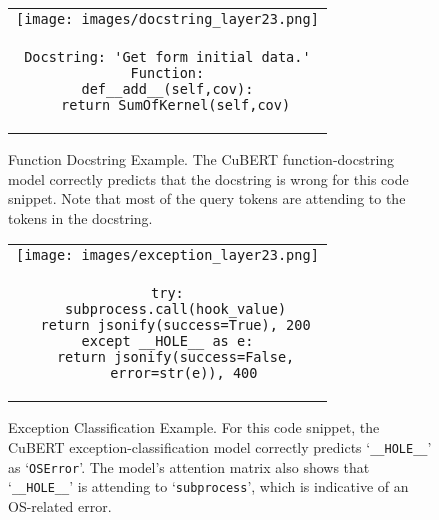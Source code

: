 \documentclass{article}
\begin{document}
\begin{figure*}
    \centering
    \begin{tabular}{c}
    \texttt{[image: images/docstring\_layer23.png]}\\
    \begin{lstlisting}[linewidth=0.6\textwidth]
Docstring: 'Get form initial data.'
Function:
def__add__(self,cov):
  return SumOfKernel(self,cov)
      \end{lstlisting} 
    \end{tabular}
    \caption{Function Docstring Example. The CuBERT function-docstring model correctly predicts that the docstring is wrong for this code snippet. Note that most of the query tokens are attending to the tokens in the docstring.}
    \label{fig:docstring_visualization}
\end{figure*}
\begin{figure*}
    \centering
    \begin{tabular}{c}
    \texttt{[image: images/exception\_layer23.png]}\\
    \begin{lstlisting}[linewidth=0.6\textwidth]
try:
  subprocess.call(hook_value)
  return jsonify(success=True), 200
except __HOLE__ as e:
  return jsonify(success=False,
    error=str(e)), 400
      \end{lstlisting} 
    \end{tabular}
    \caption{Exception Classification Example. For this code snippet, the CuBERT exception-classification model correctly predicts `{\tt \_\_HOLE\_\_}' as `{\tt OSError}'. The model's attention matrix also shows that `{\tt \_\_HOLE\_\_}' is attending to `{\tt subprocess}', which is indicative of an OS-related error.}
    \label{fig:exception_visualization}
\end{figure*}
\end{document}
